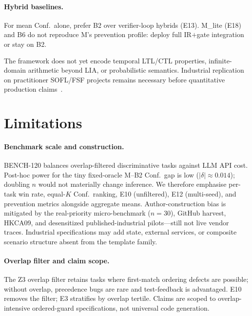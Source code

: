 \paragraph{Hybrid baselines.}
For mean Conf.\ alone, prefer B2 over verifier-loop hybrids (E13).
M\_lite (E18) and B6 do not reproduce M's prevention profile: deploy full
IR$+$gate integration or stay on B2.

The framework does not yet encode temporal LTL/CTL properties, infinite-domain
arithmetic beyond LIA, or probabilistic semantics.
Industrial replication on practitioner SOFL/FSF projects remains necessary
before quantitative production claims~\citep{li2022qrs_companion,pohl2010requirements}.


\section{Limitations}
\label{sec:disc:limitations}

\paragraph{Benchmark scale and construction.}
BENCH-120 balances overlap-filtered discriminative tasks against LLM API cost.
Post-hoc power for the tiny fixed-oracle M--B2 Conf.\ gap is low
($|\delta|{\approx}0.014$); doubling $n$ would not materially change
inference.
We therefore emphasise per-task win rate, equal-$K$ Conf.\ ranking, E10
(unfiltered), E12 (multi-seed), and prevention metrics alongside aggregate
means.
Author-construction bias is mitigated by the real-priority micro-benchmark
($n{=}30$), GitHub harvest, HKCA09, and desensitized published-industrial
pilots---still not live vendor traces.
Industrial specifications may add state, external services, or composite
scenario structure absent from the template family.

\paragraph{Overlap filter and claim scope.}
The Z3 overlap filter retains tasks where first-match ordering defects are
possible; without overlap, precedence bugs are rare and test-feedback is
advantaged.
E10 removes the filter; E3 stratifies by overlap tertile.
Claims are scoped to overlap-intensive ordered-guard specifications, not
universal code generation.

